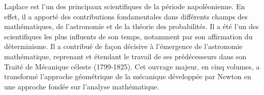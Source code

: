 Laplace est l'un des principaux scientifiques de la période napoléonienne. 
En effet, il a apporté des contributions fondamentales dans différents champs 
des mathématiques, de l'astronomie et de la théorie des probabilités. Il a 
été l'un des scientifiques les plus influents de son temps, notamment par son 
affirmation du déterminisme. Il a contribué de façon décisive à l'émergence 
de l'astronomie mathématique, reprenant et étendant le travail de ses 
prédécesseurs dans son Traité de Mécanique céleste (1799-1825). Cet ouvrage 
majeur, en cinq volumes, a transformé l'approche géométrique de la mécanique
développée par Newton en une approche fondée sur l'analyse mathématique.
